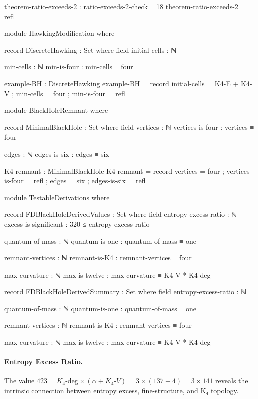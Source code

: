 \documentclass[11pt,a4paper]{book}
\begin{document}
\begin{code}
  theorem-ratio-exceeds-2 : ratio-exceeds-2-check ≡ 18
  theorem-ratio-exceeds-2 = refl

module HawkingModification where

  record DiscreteHawking : Set where
    field
      initial-cells : ℕ
      
      min-cells : ℕ
      min-is-four : min-cells ≡ four
      
  example-BH : DiscreteHawking
  example-BH = record
    { initial-cells = K4-E + K4-V
    ; min-cells = four
    ; min-is-four = refl
    }

module BlackHoleRemnant where

  record MinimalBlackHole : Set where
    field
      vertices : ℕ
      vertices-is-four : vertices ≡ four
      
      edges : ℕ
      edges-is-six : edges ≡ six
      
  K4-remnant : MinimalBlackHole
  K4-remnant = record
    { vertices = four
    ; vertices-is-four = refl
    ; edges = six
    ; edges-is-six = refl
    }
    
module TestableDerivations where

  record FDBlackHoleDerivedValues : Set where
    field
      entropy-excess-ratio : ℕ
      excess-is-significant : 320 ≤ entropy-excess-ratio
      
      quantum-of-mass : ℕ
      quantum-is-one : quantum-of-mass ≡ one
      
      remnant-vertices : ℕ
      remnant-is-K4 : remnant-vertices ≡ four
      
      max-curvature : ℕ
      max-is-twelve : max-curvature ≡ K4-V * K4-deg
      
  record FDBlackHoleDerivedSummary : Set where
    field
      entropy-excess-ratio : ℕ
      
      quantum-of-mass : ℕ
      quantum-is-one : quantum-of-mass ≡ one
      
      remnant-vertices : ℕ
      remnant-is-K4 : remnant-vertices ≡ four
      
      max-curvature : ℕ
      max-is-twelve : max-curvature ≡ K4-V * K4-deg
      
\end{code}

\paragraph{Entropy Excess Ratio.}
The value $423 = K_4\text{-deg} \times (\alpha + K_4\text{-}V) = 3 \times (137 + 4) = 3 \times 141$
reveals the intrinsic connection between entropy excess, fine-structure, and K₄ topology.
\end{document}
